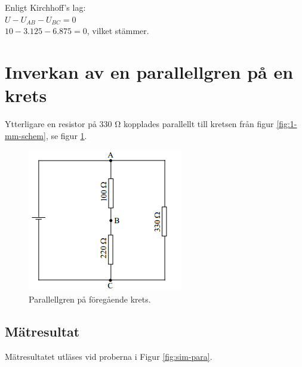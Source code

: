 \documentclass[11pt,a4paper]{article}
\begin{document}
Enligt Kirchhoff's lag:\\

$U - U_{AB} - U_{BC} = 0$\\
$10 - 3.125 - 6.875 = 0$, vilket stämmer. 

\clearpage

\section{Inverkan av en parallellgren på en krets}\label{}
Ytterligare en resistor på 330 \si{\ohm} kopplades parallellt till kretsen från
figur \ref{fig:1-mm-schem}, se figur \ref{fig:2-mm-schem}.

\begin{figure}[htbp]
    \centering
        \includegraphics[scale=1.0]{misc/krets2.png}
    \caption{Parallellgren på föregående krets.}
    \label{fig:2-mm-schem}
\end{figure}

\subsection{Mätresultat}\label{}
Mätresultatet utläses vid proberna i Figur \ref{fig:sim-para}.
\end{document}
